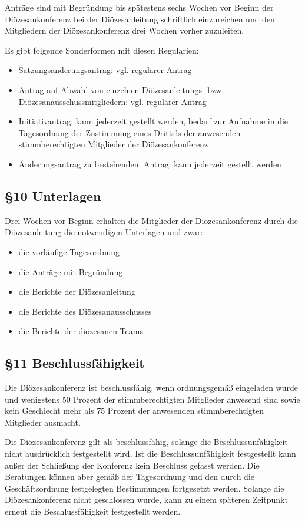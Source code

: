 \documentclass[12pt]{report}
\begin{document}
\begin{justify}
Anträge sind mit Begründung bis spätestens sechs Wochen vor Beginn der Diözesankonferenz bei der Diözesanleitung
schriftlich einzureichen und den Mitgliedern der Diözesankonferenz drei Wochen vorher zuzuleiten.

Es gibt folgende Sonderformen mit diesen Regularien:
\begin{itemize}
  \item Satzungsänderungsantrag: vgl. regulärer Antrag
  \item Antrag auf Abwahl von einzelnen Diözesanleitungs- bzw. Diözesanausschussmitgliedern:
        vgl. regulärer Antrag
  \item Initiativantrag: kann jederzeit gestellt werden, bedarf zur Aufnahme in die Tagesordnung der Zustimmung
        eines Drittels der anwesenden stimmberechtigten Mitglieder der Diözesankonferenz
  \item Änderungsantrag zu bestehendem Antrag: kann jederzeit gestellt werden
\end{itemize}

\subsection*{§10 Unterlagen}
Drei Wochen vor Beginn erhalten die Mitglieder der Diözesankonferenz durch die Diözesanleitung die notwendigen
Unterlagen und zwar:
\begin{itemize}
  \item die vorläufige Tagesordnung
  \item die Anträge mit Begründung
  \item die Berichte der Diözesanleitung 
  \item die Berichte des Diözesanausschusses 
  \item die Berichte der diözesanen Teams
\end{itemize}

\subsection*{§11 Beschlussfähigkeit}
Die Diözesankonferenz ist beschlussfähig, wenn ordnungsgemäß eingeladen wurde und wenigstens 50 Prozent
der stimmberechtigten Mitglieder anwesend sind sowie kein Geschlecht mehr als 75 Prozent der anwesenden stimmberechtigten Mitglieder ausmacht.

Die Diözesankonferenz gilt als beschlussfähig, solange die Beschlussunfähigkeit nicht ausdrücklich
festgestellt wird. Ist die Beschlussunfähigkeit festgestellt kann außer
der Schließung der Konferenz kein Beschluss gefasst werden. Die Beratungen können aber gemäß der Tagesordnung und den durch die Geschäftsordnung festgelegten Bestimmungen fortgesetzt werden. Solange die Diözesankonferenz nicht geschlossen wurde, kann zu einem späteren Zeitpunkt erneut die Beschlussfähigkeit festgestellt werden.


\end{justify}
\end{document}
